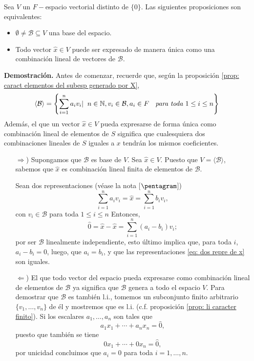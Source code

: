 \begin{teo}
	\label{teo: equiv de base}
Sea $V$ un $F-$espacio vectorial distinto de $\{ 0 \}$.
Las siguientes proposiciones son equivalentes:
\begin{itemize}
	\item $\emptyset \neq \mathcal{B} \subseteq V$ una base del espacio.
	\item Todo vector $\hat{x} \in V$ puede ser expresado de manera
	única como una combinación lineal de vectores de $\mathcal{B}$.
\end{itemize} 
\end{teo}
\noindent
\textbf{Demostración.}
Antes de comenzar, recuerde que, según la proposición
\ref{prop: caract elementos del subesp generado por X},
\[
\langle \mathcal{B} \rangle = 
\left\{ \sum_{i=1}^{n} a_{i}v_{i} | \hspace{0.2cm} 
n \in \mathbb{N}, v_{i} \in \mathcal{B}, 
a_{i} \in F \hspace{0.2cm} \textit{ para toda }
1 \leq i \leq n \right\}
\]
Además, el que
un vector $\hat{x} \in V$ pueda expresarse de forma única
como combinación lineal de elementos de
$S$ significa que cualesquiera dos combinaciones
lineales de $S$ iguales a $x$ tendrán los mismos coeficientes.
\begin{itemize}
	\item[$\Rightarrow$)] Supongamos que $\mathcal{B}$ es base de $V$.
	Sea $\hat{x} \in V$. Puesto que $V = \langle \mathcal{B} \rangle$,
	sabemos que $\hat{x}$ es combinación lineal 
	finita de elementos de $\mathcal{B}$.
	
	Sean dos representaciones (véase la nota [$\pentagram$])
	\begin{equation}
		\label{eq: dos repre de x}
		\sum_{i=1}^{n} a_{i} v_{i} = \hat{x} = 
	\sum_{i=1}^{n} b_{i} v_{i},
	\end{equation}
	con $v_{i} \in \mathcal{B}$ para toda $1 \leq i \leq n$
	Entonces,
	\[
	\hat{0} = \hat{x} - \hat{x} = 
	\sum_{i=1}^{n} (a_{i} - b_{i}) v_{i};
	\]
	por ser $\mathcal{B}$ linealmente independiente, esto último
	implica que, para toda $i$, $a_{i} - b_{i} = 0$, luego,
	que $a_{i} = b_{i}$, y que las representaciones 
	\eqref{eq: dos repre de x} son iguales.
	
	
	\item[$\Leftarrow$)] El que todo vector del espacio pueda expresarse 
	como combinación lineal de elementos de $\mathcal{B}$ ya
	significa que $\mathcal{B}$ genera a todo el espacio $V$.
	Para demostrar que $\mathcal{B}$ es también l.i., tomemos
	un subconjunto finito arbitrario
	$\{ v_{1}, \ldots , v_{n} \}$ de él y mostremos que es 
	l.i. (c.f. proposición \ref{prop: li caracter finito}).
	Si los escalares $a_{1}, \ldots , a_{n}$ son tales que
	\[
	a_{1} x_{1} + \cdots + a_{n} x_{n} = \hat{0},
	\]
	puesto que también se tiene
	\[
	0 x_{1} + \cdots + 0 x_{n} = \hat{0},
	\]
	por unicidad concluimos que
	$a_{i} = 0$ para toda $i = 1, \ldots , n$. 
	 
\end{itemize}
\QEDB
\vspace{0.2cm}


